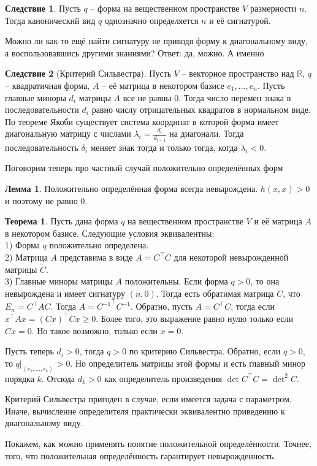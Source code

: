 \documentclass[10pt,a4paper,oneside]{book} %
\theoremstyle{definition}
\newtheorem{thm}{Теорема}
\newtheorem{lem}{Лемма}
\newtheorem{cor}{Следствие}
\newcommand{\mb}[1]{\mathbb{#1}}
\def\lan{\left\langle }
\def\ran{\right\rangle}
\def\thrm{\begin{thm}}
\def\ethrm{\end{thm}}
\def\lm{\begin{lem}}
\def\elm{\end{lem}}
\def\crl{\begin{cor}}
\def\ecrl{\end{cor}}
\begin{document}
\crl Пусть $q$ -- форма на вещественном пространстве  $V$ размерности $n$. Тогда канонический вид $q$ однозначно определяется $n$ и её  сигнатурой. 
\ecrl

Можно ли как-то ещё найти сигнатуру не приводя форму к диагональному виду, а воспользовавшись другими знаниями? Ответ: да, можно. А именно

\crl[Критерий Сильвестра]
Пусть $V$ -- векторное пространство над $\mb R$, $q$ -- квадратичная форма, $A$ -- её матрица в некотором базисе $e_1,\dots,e_n$. Пусть главные миноры  $d_i$ матрицы $A$ все не равны $0$. Тогда число перемен знака в последовательности $d_i$ равно числу отрицательных квадратов в нормальном виде.
\proof По теореме Якоби существует система координат в которой форма имеет диагональную матрицу с числами $\lambda_i=\frac{d_i}{d_{i-1}}$ на диагонали. Тогда последовательность $\delta_i$ меняет знак тогда и только тогда, когда $\lambda_i<0$.
\endproof
\ecrl

Поговорим теперь про частный случай положительно определённых форм


\lm Положительно определённая форма всегда невырождена.
\proof $h(x,x)>0$ и поэтому не равно 0.
\endproof
\elm

\thrm
Пусть дана форма $q$ на вещественном пространстве $V$ и её матрица $A$ в некотором базисе. Следующие условия эквивалентны:\\
1) Форма $q$ положительно определена.\\
2) Матрица $A$ представима в виде $A=C^{\top}C$ для некоторой невырожденной матрицы $C$.\\
3) Главные миноры матрицы $A$ положительны.
\proof
Если форма $q>0$, то она невырождена и имеет сигнатуру $(n,0)$. Тогда есть обратимая матрица $C$,  что $E_n=C^{\top}AC$. Тогда $A={C^{-1}}^{\top}C^{-1}$. Обратно, пусть $A=C^{\top}C$, тогда если $x^{\top}Ax=(Cx)^{\top}Cx\geq 0$. Более того, это выражение равно нулю только если $Cx=0$. Но такое возможно, только если $x=0$.


Пусть теперь $d_i>0$, тогда $q>0$ по критерию Сильвестра. Обратно, если $q>0$, то $q|_{\lan e_1,\dots,e_k\ran} >0$. Но определитель матрицы этой формы и есть главный минор порядка $k$. Отсюда $d_k>0$ как определитель произведения $\det C^{\top}C=\det^2 C$.
\endproof
\ethrm

Критерий Сильвестра пригоден в случае, если имеется задача с параметром. Иначе, вычисление определителя практически эквивалентно приведению к диагональному виду. 

Покажем, как можно применять понятие положительной определённости. Точнее, того, что положительная определённость гарантирует невырожденность.
\end{document}

